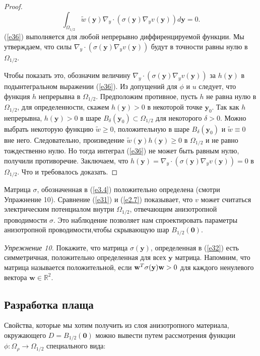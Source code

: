 \documentclass[a4paper, 12pt]{article}
\begin{document}
\begin{proof}
\begin{equation}\label{e36}
\int_{\Omega_{1/2}}{\tilde{w}(\textbf{y})\nabla_y \cdot (\sigma(\textbf{y})\nabla_y 
v(\textbf{y})) d\textbf{y}} =0.
\end{equation}
(\ref{e36}) выполняется для любой непрерывно диффиренцируемой функции. Мы утверждаем, что силы 
$\nabla_y \cdot (\sigma(\textbf{y})\nabla_y v(\textbf{y}))$ будут в точности равны нулю в $\Omega_{1/2}$.


Чтобы показать это, обозначим величину $\nabla_y \cdot (\sigma(\textbf{y})\nabla_y v(\textbf{y}))$ за
$h(\textbf{y})$ в подынтегральном выражении (\ref{e36}). Из допущений для $\phi$ и $u$ следует, 
что функция $h$ непрерывна в $\Omega_{1/2}$.
Предположим противное, пусть $h$ не равна нулю в $\Omega_{1/2}$, для определенности, скажем
$h(\textbf{y})>0$ в некоторой точке $\textbf{y}_0$. Так как $h$ непрерывна, $h(\textbf{y})>0$ в шаре
$B_{\delta}(\textbf{y}_0) \subset \Omega_{1/2}$ для некоторого $\delta > 0$.
Можно выбрать некоторую функцию $\tilde{w} \geq 0$, положительную в шаре $B_{\delta}(\textbf{y}_0)$ и 
$\tilde{w} \equiv 0$ вне него. Следовательно, произведение $\tilde{w}(\textbf{y})h(\textbf{y}) \geq 0$ в
$\Omega_{1/2}$ и не равно тождественно нулю. Но тогда интеграл (\ref{e36}) не может быть равным нулю,
получили противоречие. Заключаем, что $h(\textbf{y}) = \nabla_y \cdot (\sigma(\textbf{y})\nabla_y
v(\textbf{y})) = 0$ в $\Omega_{1/2}$. Что и требовалось доказать.
\end{proof}
Матрица $\sigma$, обозначенная в (\ref{e3.4}) положительно определена (смотри Упражнение 10).
Сравнение (\ref{e31}) и (\ref{e2.7}) показывает, что $v$ может считаться электрическим потенциалом внутри
$\Omega_{1/2}$, отвечающим анизотропной проводимости $\sigma$. Это наблюдение позволяет нам спроектировать
параметры анизотропной проводимости,чтобы скрывающую шар $B_{1/2}(\textbf{0})$.

\textit{Упрежнение 10.} Покажите, что матрица $\sigma(\textbf{y})$, определенная в (\ref{e32}) есть
симметричная, положительно определенная для всех $\textbf{y}$ матрица.   
Напомним, что матрица называется положительной, если $\textbf{w}^T\sigma(\textbf{\textbf{y}})\textbf{w}>0$
для каждого ненулевого вектора $\textbf{w} \in \mathbb{R}^2$.

\subsection{Разработка плаща}
Свойства, которые мы хотим получить из слоя анизотропного материала, окружающего $D = B_{1/2}(\textbf{0})$
можно вывести путем рассмотрения функции $\phi: \Omega_{\rho} \to \Omega_{1/2}$ специального вида:
\end{document}
